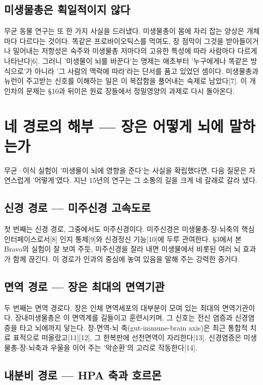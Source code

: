 \documentclass[12pt,oneside]{book}
\begin{document}
\subsection{미생물총은 획일적이지 않다}

무균 동물 연구는 또 한 가지 사실을 드러냈다. 미생물총이 몸에 자리 잡는 양상은 개체마다 다르다는 것이다. 똑같은 프로바이오틱스를 먹여도, 장 점막이 그것을 받아들이거나 밀어내는 저항성은 숙주와 미생물총 저마다의 고유한 특성에 따라 사람마다 다르게 나타난다[6]. 그러니 '미생물이 뇌를 바꾼다'는 명제는 애초부터 '누구에게나 똑같은 방식으로'가 아니라 '그 사람의 맥락에 따라'라는 단서를 품고 있었던 셈이다. 미생물총과 뉴런이 주고받는 신호를 이해하는 일은 이 복잡함을 풀어내는 숙제로 남았다[7]. 이 개인차의 문제는 §10과 뒤이은 원료 장들에서 정밀영양의 과제로 다시 돌아온다.

\section{네 경로의 해부 — 장은 어떻게 뇌에 말하는가}

무균·이식 실험이 '미생물이 뇌에 영향을 준다'는 사실을 확립했다면, 다음 질문은 자연스럽게 '어떻게'였다. 지난 15년의 연구는 그 소통의 길을 크게 네 갈래로 갈라 냈다.

\subsection{신경 경로 — 미주신경 고속도로}

첫 번째는 신경 경로, 그중에서도 미주신경이다. 미주신경은 미생물총-장-뇌축의 핵심 인터페이스로서[8] 인지 통제[9]와 신경정신 기능[10]에 두루 관여한다. §3에서 본 Bravo의 실험이 잘 보여 주듯, 미주신경을 잘라 내면 미생물에서 비롯된 여러 뇌 효과가 함께 끊긴다. 이 경로가 인과의 중심에 놓여 있음을 말해 주는 강력한 증거다.

\subsection{면역 경로 — 장은 최대의 면역기관}

두 번째는 면역 경로다. 장은 인체 면역세포의 대부분이 모여 있는 최대의 면역기관이다. 장내미생물총은 이 면역계를 길들이고 훈련시키며, 그 신호는 전신 염증과 신경염증을 타고 뇌에까지 닿는다. 장-면역-뇌 축(gut-immune-brain axis)은 최근 통합적 치료 표적으로 떠올랐고[11][12], 그 한복판에 선천면역이 자리한다[13]. 신경염증은 미생물총-장-뇌축과 우울을 이어 주는 '악순환'의 고리로 작동한다[14].

\subsection{내분비 경로 — HPA 축과 호르몬}
\end{document}

